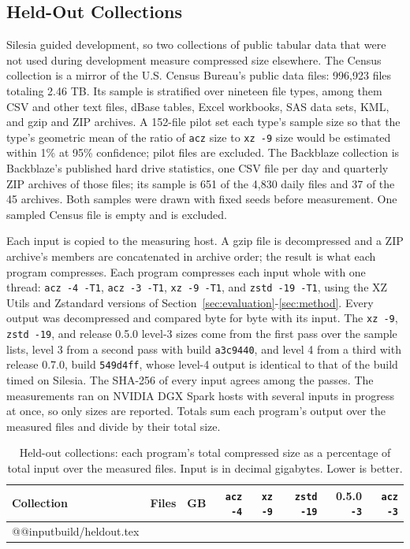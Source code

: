 \documentclass[10pt,letterpaper]{article}
\newcommand{\acz}{\texttt{acz}}
\newcommand{\code}[1]{\texttt{#1}}
\begin{document}
\subsection{Held-Out Collections}\label{sec:heldout}
Silesia guided development, so two collections of public tabular data that were not used during development measure compressed size elsewhere. The Census collection is a mirror of the U.S. Census Bureau's public data files: 996,923 files totaling 2.46 TB. Its sample is stratified over nineteen file types, among them CSV and other text files, dBase tables, Excel workbooks, SAS data sets, KML, and gzip and ZIP archives. A 152-file pilot set each type's sample size so that the type's geometric mean of the ratio of \acz{} size to \mbox{\code{xz -9}} size would be estimated within 1\% at 95\% confidence; pilot files are excluded. The Backblaze collection is Backblaze's published hard drive statistics, one CSV file per day and quarterly ZIP archives of those files; its sample is 651 of the 4,830 daily files and 37 of the 45 archives. Both samples were drawn with fixed seeds before measurement. One sampled Census file is empty and is excluded.

Each input is copied to the measuring host. A gzip file is decompressed and a ZIP archive's members are concatenated in archive order; the result is what each program compresses. Each program compresses each input whole with one thread: \mbox{\code{acz -4 -T1}}, \mbox{\code{acz -3 -T1}}, \mbox{\code{xz -9 -T1}}, and \mbox{\code{zstd -19 -T1}}, using the XZ Utils and Zstandard versions of Section~\ref{sec:evaluation}-\ref{sec:method}. Every output was decompressed and compared byte for byte with its input. The \mbox{\code{xz -9}}, \mbox{\code{zstd -19}}, and release 0.5.0 level-3 sizes come from the first pass over the sample lists, level 3 from a second pass with build \code{a3c9440}, and level 4 from a third with release 0.7.0, build \code{549d4ff}, whose level-4 output is identical to that of the build timed on Silesia. The SHA-256 of every input agrees among the passes. The measurements ran on NVIDIA DGX Spark hosts with several inputs in progress at once, so only sizes are reported. Totals sum each program's output over the measured files and divide by their total size.

\begin{table}[htbp]
\centering
\caption{Held-out collections: each program's total compressed size as a percentage of total input over the measured files. Input is in decimal gigabytes. Lower is better.}\label{tab:heldout}
\medskip
\small
\begin{tabular}{@{}lrrrrrrr@{}}
\toprule
Collection & Files & GB & \code{acz -4} & \code{xz -9} & \code{zstd -19} & 0.5.0 \code{-3} & \code{acz -3}\\
\midrule
\csname @@input\endcsname build/heldout.tex
\bottomrule
\end{tabular}
\end{table}
\end{document}
